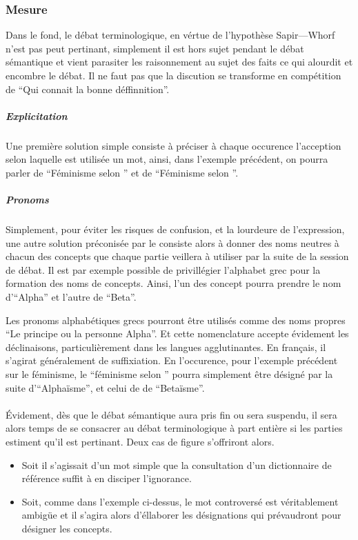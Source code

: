 \subsubsection{Mesure}
Dans le fond, le débat terminologique, en vértue de l’hypothèse Sapir—Whorf n’est pas peut pertinant, simplement il est hors sujet pendant le débat sémantique et vient parasiter les raisonnement au sujet des faits ce qui alourdit et encombre le débat. Il ne faut pas que la discution se transforme en compétition de \enquote{Qui connait la bonne déffinnition}.

\paragraph{}
\subparagraph{Explicitation}
Une première solution simple consiste à préciser à chaque occurence l’acception selon laquelle est utilisée un mot, ainsi, dans l’exemple précédent, on pourra parler de \enquote{Féminisme selon \A} et de \enquote{Féminisme selon \B}.

\subparagraph{Pronoms}
Simplement, pour éviter les risques de confusion, et la lourdeure de l’expression, une autre solution préconisée par le \mainabbr{} consiste alors à donner des noms neutres à chacun des concepts que chaque partie veillera à utiliser par la suite de la session de débat. Il est par exemple possible de privillégier l’alphabet grec pour la formation des noms de concepts. Ainsi, l’un des concept pourra prendre le nom d’\enquote{Alpha} et l’autre de \enquote{Beta}.

Les pronoms alphabétiques grecs pourront être utilisés comme des noms propres \enquote{Le principe ou la personne Alpha}. Et cette nomenclature accepte évidement les déclinaisons, particulièrement dans les langues agglutinantes. En français, il s’agirat généralement de suffixiation. En l’occurence, pour l’exemple précédent sur le féminisme, le \enquote{féminisme selon \A} pourra simplement être désigné par la suite d’\enquote{Alphaïsme}, et celui de \B de \enquote{Betaïsme}.

\paragraph{}
Évidement, dès que le débat sémantique aura pris fin ou sera suspendu, il sera alors temps de se consacrer au débat terminologique à part entière si les parties estiment qu’il est pertinant. Deux cas de figure s’offriront alors.
\begin{itemize}
  \item Soit il s’agissait d’un mot simple que la consultation d’un dictionnaire de référence suffit à en disciper l’ignorance.

  \item Soit, comme dans l’exemple ci-dessus, le mot controversé est véritablement ambigüe et il s’agira alors d’éllaborer les désignations qui prévaudront pour désigner les concepts.
\end{itemize}

